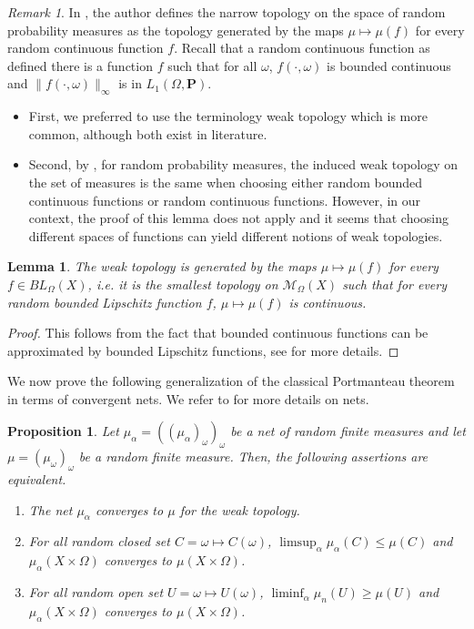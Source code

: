 \documentclass{amsart}
\newtheorem{prop}[thm]{Proposition}
\newtheorem{lem}[thm]{Lemma}
\theoremstyle{definition}
\theoremstyle{remark}
\newtheorem{rem}[thm]{Remark}
\begin{document}
\begin{rem}
In \cite{Crauel}, the author defines the narrow topology on the space of random probability measures as the topology generated by the maps $\mu\mapsto \mu(f)$ for every random continuous function $f$.
    Recall that a random continuous function as defined there is a function $f$ such that for all $\omega$, $f(\cdot,\omega)$ is bounded continuous and $\|f(\cdot,\omega)\|_\infty$ is in $L_1(\Omega,\mathbf P)$.
\begin{itemize}
    \item First, we preferred to use the terminology weak topology which is more common, although both exist in literature.
    \item Second, by \cite[Lemma~3.16]{Crauel}, for random probability measures, the induced weak topology on the set of measures is the same when choosing either random bounded continuous functions or random continuous functions.
    However, in our context, the proof of this lemma does not apply and it seems that choosing different spaces of functions can yield different notions of weak topologies.
\end{itemize}
\end{rem}

\begin{lem}\label{lipschitzgenerateweaktopology}
The weak topology is generated by the maps $\mu \mapsto \mu(f)$ for every $f\in BL_\Omega(X)$, i.e. it is the smallest topology on $\mathcal{M}_\Omega(X)$ such that for every random bounded Lipschitz function $f$, $\mu\mapsto \mu(f)$ is continuous.
\end{lem}

\begin{proof}
This follows from the fact that bounded continuous functions can be approximated by bounded Lipschitz functions, see \cite[Proposition~4.9]{Crauel} for more details.
\end{proof}

We now prove the following generalization of the classical Portmanteau theorem in terms of convergent nets.
We refer to \cite[Definition~2.11, Definition~2.15]{AliprantisBorder} for more details on nets.

\begin{prop}\label{randomPortmanteau}
Let $\mu_{\alpha}=((\mu_\alpha)_\omega)_\omega$ be a net of random finite measures and let $\mu=(\mu_\omega)_\omega$ be a random finite measure.
Then, the following assertions are equivalent.
\begin{enumerate}
    \item The net $\mu_\alpha$ converges to $\mu$ for the weak topology.
    \item For all random closed set $C=\omega\mapsto C(\omega)$, $\limsup_\alpha\mu_\alpha(C)\leq \mu(C)$ and $\mu_\alpha(X\times \Omega)$ converges to $\mu(X\times \Omega)$.
    \item For all random open set $U=\omega\mapsto U(\omega)$, $\liminf_\alpha\mu_n(U)\geq \mu(U)$ and $\mu_\alpha(X\times \Omega)$ converges to $\mu(X\times \Omega)$.
\end{enumerate}
\end{prop}
\end{document}
